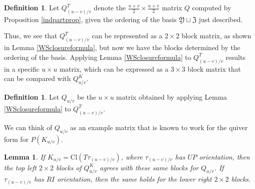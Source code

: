 \documentclass[11pt]{amsart}
\theoremstyle{plain}
\newtheorem{lemmaN}[theoremN]{Lemma}
\theoremstyle{definition}
\newtheorem{definitionN}[theoremN]{Definition}
\theoremstyle{remark}
\begin{document}
\begin{definitionN}
    Let $Q_{(u-v)/v}^T$ denote the $\frac{u+v}{2}\times \frac{u+v}{2}$ matrix $Q$ computed by Proposition \ref{indpartprop}, given the ordering of the basis $\mathfrak{Y}\sqcup\mathfrak{Z}$ just described.
\end{definitionN}

Thus, we see that $Q_{(u-v)/v}^T$ can be represented as a $2\times 2$ block matrix, as shown in Lemma \ref{WSclosureformula}, but now we have the blocks determined by the ordering of the basis. Applying Lemma \ref{WSclosureformula} to $Q_{(u-v)/v}^T$ results in a specific $u\times u$ matrix, which can be expressed as a $3\times 3$ block matrix that can be compared with $Q_{u/v}^K$.

\begin{definitionN}
    Let $Q_{u/v}$ be the $u\times u$ matrix obtained by applying Lemma \ref{WSclosureformula} to $Q_{(u-v)/v}^T$.
\end{definitionN}

We can think of $Q_{u/v}$ as an example matrix that is known to work for the quiver form for $P(K_{u/v})$. 

\begin{lemmaN}
\label{Qplusblockknots}
   If $K_{u/v}=\text{Cl}(T\tau_{(u-v)/v})$, where $\tau_{(u-v)/v}$ has $UP$ orientation, then the top left $2\times 2$ blocks of $Q_{u/v}^K$ agrees with these same blocks for $Q_{u/v}$. If $\tau_{(u-v)/v}$ has $RI$ orientation, then the same holds for the lower right $2\times 2$ blocks.
\end{lemmaN}
\end{document}
